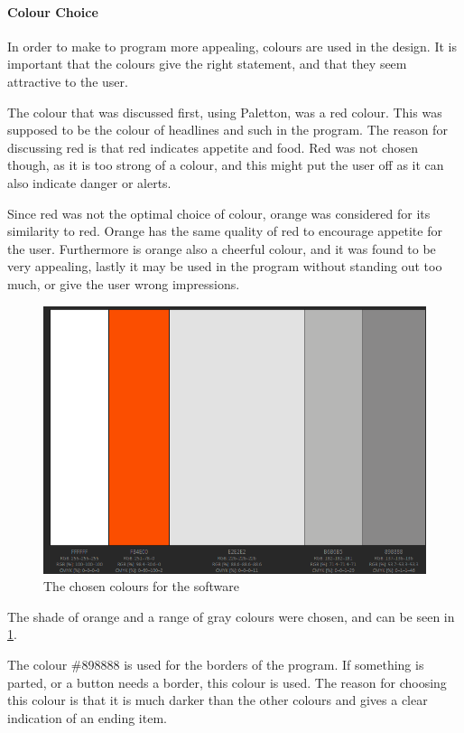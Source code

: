 \paragraph{Colour Choice}

In order to make to program more appealing, colours are used in the design. It is important that the colours give the right statement, and that they seem attractive to the user.

The colour that was discussed first, using Paletton, was a red colour. This was supposed to be the colour of headlines and such in the program. The reason for discussing red is that red indicates appetite and food\cite{color_psychology}. Red was not chosen though, as it is too strong of a colour, and this might put the user off as it can also indicate danger or alerts.

Since red was not the optimal choice of colour, orange was considered for its similarity to red. Orange has the same quality of red to encourage appetite for the user. Furthermore is orange also a cheerful colour, and it was found to be very appealing, lastly it may be used in the program without standing out too much, or give the user wrong impressions.

\begin{figure}[H]
	\centering
    \includegraphics[width=\textwidth, clip=true, trim=0cm 0cm 0cm 8cm]{Grafik/FoodPlanner/ChosenColours}
	\caption{The chosen colours for the software}
	\label{ChosenColours}
\end{figure}
The shade of orange and a range of gray colours were chosen, and can be seen in \cref{ChosenColours}.

The colour \#898888 is used for the borders of the program. If something is parted, or a button needs a border, this colour is used. The reason for choosing this colour is that it is much darker than the other colours and gives a clear indication of an ending item.

